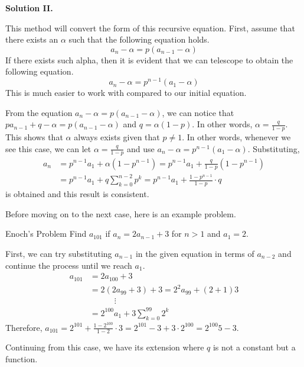 \documentclass[../../../main.tex]{subfiles}
\begin{document}
{\large\textbf{Solution II.}}

This method will convert the form of this recursive equation.
First, assume that there exists an $\alpha$ such that the following
equation holds.
\[
a_n - \alpha = p (a_{n-1} - \alpha)
\]
If there exists such alpha, then it is evident that we can telescope
to obtain the following equation.
\[
a_n - \alpha = p^{n-1} (a_1 - \alpha)
\]
This is much easier to work with compared to our initial equation.

From the equation $a_n - \alpha = p (a_{n-1} - \alpha)$, we can notice
that $p a_{n-1} + q - \alpha = p (a_{n-1} - \alpha)$ and
$q = \alpha (1 - p)$. In other words, $\alpha = \frac{q}{1 - p}$.
This shows that $\alpha$ always exists given that $p \neq 1$.
In other words, whenever we see this case, we can let $\alpha =
\frac{q}{1 - p}$ and use $a_n - \alpha = p^{n-1} (a_1 - \alpha)$.
Substituting,
\begin{align*}
    a_n
    &= p^{n-1} a_1 + \alpha \left( 1 - p^{n-1} \right)
    = p^{n-1} a_1 + \frac{q}{1 - p} \left( 1 - p^{n-1} \right) \\
    &= p^{n-1} a_1 + q \sum_{k=0}^{n-2} p^k
    = p^{n-1} a_1 + \frac{1 - p^{n-1}}{1 - p} \cdot q
\end{align*}
is obtained and this result is consistent.

Before moving on to the next case, here is an example problem.

\begin{problem}{Enoch's Problem}{}
Find $a_{101}$ if $a_n = 2a_{n-1} + 3$ for $n > 1$ and $a_1 = 2$.
\end{problem}
\begin{solution}
First, we can try substituting $a_{n-1}$ in the given equation in
terms of $a_{n-2}$ and continue the process until we reach $a_1$.
\begin{align*}
    a_{101}
    &= 2 a_{100} + 3 \\
    &= 2 (2 a_{99} + 3) + 3
    = 2^2 a_{99} + (2 + 1) 3 \\
    &\qquad\quad\vdots \\
    &= 2^{100} a_1 + 3 \sum_{k=0}^{99} 2^k
\end{align*}
Therefore, $a_{101} = 2^{101} + \frac{1 - 2^{100}}{1 - 2} \cdot 3
= 2^{101} - 3 + 3 \cdot 2^{100} = 2^{100} 5 - 3$.
\end{solution}

Continuing from this case, we have its extension where $q$ is not
a constant but a function.
\end{document}
